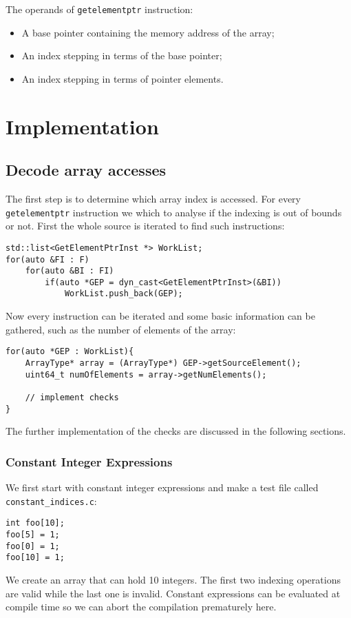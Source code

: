 \documentclass{report}
\begin{document}
The operands of \texttt{getelementptr} instruction:
\begin{itemize}
	\item A base pointer containing the memory address of the array;
	\item An index stepping in terms of the base pointer;
	\item An index stepping in terms of pointer elements.
\end{itemize}


\section{Implementation}
\subsection{Decode array accesses}
The first step is to determine which array index is accessed. For every \texttt{getelementptr} instruction we which to analyse if the indexing is out of bounds or not. First the whole source is iterated to find such instructions:
\begin{lstlisting}
std::list<GetElementPtrInst *> WorkList;
for(auto &FI : F)
	for(auto &BI : FI)
		if(auto *GEP = dyn_cast<GetElementPtrInst>(&BI))
			WorkList.push_back(GEP);
\end{lstlisting}

Now every instruction can be iterated and some basic information can be gathered, such as the number of elements of the array:
\begin{lstlisting}
for(auto *GEP : WorkList){
	ArrayType* array = (ArrayType*) GEP->getSourceElement();
	uint64_t numOfElements = array->getNumElements();
	
	// implement checks
}
\end{lstlisting}
The further implementation of the checks are discussed in the following sections.
\subsubsection{Constant Integer Expressions}
We first start with constant integer expressions and make a test file called \texttt{constant\_indices.c}:
\begin{lstlisting}
int foo[10];
foo[5] = 1;
foo[0] = 1;
foo[10] = 1;
\end{lstlisting}
We create an array that can hold 10 integers. The first two indexing operations are valid while the last one is invalid. Constant expressions can be evaluated at compile time so we can abort the compilation prematurely here. 
\end{document}
